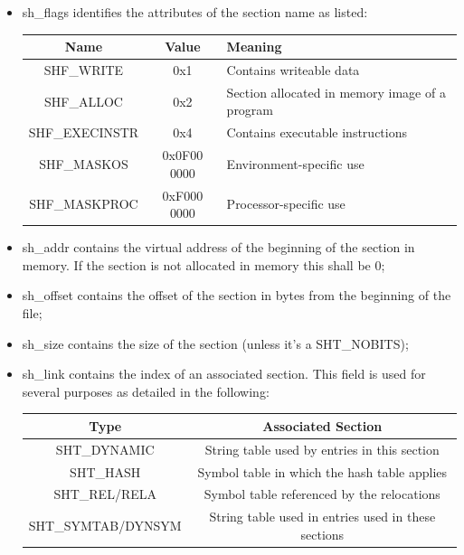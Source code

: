 \begin{itemize}
\begin{center}
        \end{center} \item {\ttfamily sh\_flags} identifies the attributes of the section name as listed:
            \begin{center} \begin{tabular}{|c|c|p{6cm}|} \hline \textbf{Name} & \textbf{Value} &
                \textbf{Meaning} \\ \hline {\ttfamily SHF\_WRITE} & 0x1 & Contains writeable data\\ \hline
                {\ttfamily SHF\_ALLOC} & 0x2 & Section allocated in memory image of a program\\ \hline
                {\ttfamily SHF\_EXECINSTR} & 0x4 & Contains executable instructions\\ \hline {\ttfamily
            SHF\_MASKOS} & 0x0F00 0000 & Environment-specific use\\ \hline {\ttfamily SHF\_MASKPROC} & 0xF000
            0000 & Processor-specific use\\ \hline \end{tabular} \end{center} \item {\ttfamily sh\_addr}
                contains the virtual address of the beginning of the section in memory. If the section is not
            allocated in memory this shall be 0; \item {\ttfamily sh\_offset} contains the offset of the section
            in bytes from the beginning of the file; \item {\ttfamily sh\_size} contains the size of the section
            (unless it's a {\ttfamily SHT\_NOBITS}); \item {\ttfamily sh\_link} contains the index of an
                associated section.  This field is used for several purposes as detailed in the following:
                \begin{center} \begin{tabular}{|c|c|} \hline \textbf{Type} & \textbf{Associated Section} \\
                    \hline {\ttfamily SHT\_DYNAMIC} & String table used by entries in this section\\ \hline
                {\ttfamily SHT\_HASH} & Symbol table in which the hash table applies\\ \hline {\ttfamily
                SHT\_REL/RELA} & Symbol table referenced by the relocations\\ \hline {\ttfamily
                SHT\_SYMTAB/DYNSYM} & String table used in entries used in these sections\\ \hline \end{tabular}

\end{center}
\end{itemize}
